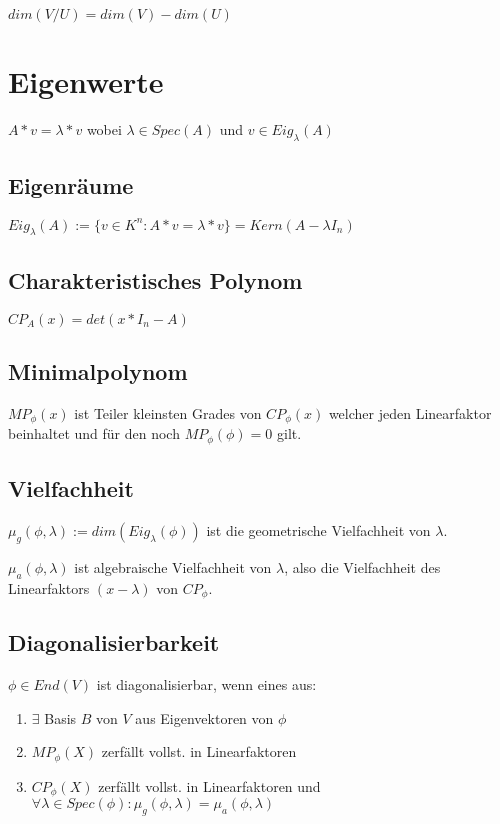 $dim(V/U) = dim(V) - dim(U)$

\section*{Eigenwerte}

$A*v = \lambda * v$ wobei $\lambda \in Spec(A)$ und $v \in Eig_\lambda(A)$

\subsection*{Eigenräume}

$Eig_\lambda(A) := \{v \in K^n : A*v = \lambda * v\} = Kern(A-\lambda I_n)$

\subsection*{Charakteristisches Polynom}

$CP_A(x) = det(x*I_n - A)$

\subsection*{Minimalpolynom}

$MP_\phi(x)$ ist Teiler kleinsten Grades von $CP_\phi(x)$ welcher jeden Linearfaktor beinhaltet und für den noch $MP_\phi(\phi) = 0$ gilt.

\subsection*{Vielfachheit}

$\mu_g(\phi, \lambda) := dim(Eig_\lambda(\phi))$ ist die geometrische Vielfachheit von $\lambda$.

$\mu_a(\phi, \lambda)$ ist algebraische Vielfachheit von $\lambda$, also die Vielfachheit des Linearfaktors $(x-\lambda)$ von $CP_\phi$.

\subsection*{Diagonalisierbarkeit}

$\phi \in End(V)$ ist diagonalisierbar, wenn eines aus:

\begin{enumerate}[label=(\alph*)]
	\item $\exists$ Basis $B$ von $V$ aus Eigenvektoren von $\phi$
	\item $MP_\phi(X)$ zerfällt vollst. in Linearfaktoren
	\item $CP_\phi(X)$ zerfällt vollst. in Linearfaktoren und $\forall \lambda \in Spec(\phi) : \mu_g(\phi,\lambda) = \mu_a(\phi, \lambda)$
\end{enumerate}

